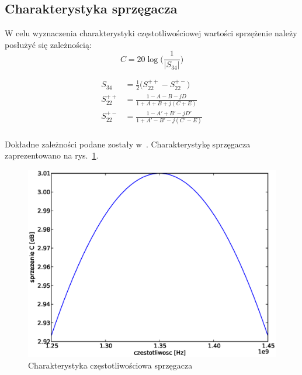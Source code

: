 \documentclass[rep.tex]{subfiles}
\begin{document}
\subsection{Charakterystyka sprzęgacza}
W celu wyznaczenia charakterystyki częstotliwościowej wartości sprzężenie należy posłużyć się zależnością:
\begin{equation}
  C = 20 \log\Big(\frac{1}{|S_{34}|}\Big)
\end{equation}

\begin{align}
  S_{34} &= \frac{1}{2} \Big(S_{22}^{++} - S_{22}^{+-}\Big) \\
  S_{22}^{++} &= \frac{1 - A - B - jD}{1 + A + B + j(C + E)} \\
  S_{22}^{+-} &= \frac{1 - A' + B' - jD'}{1 + A' - B' - j(C' - E)} \\
\end{align}

Dokładne zależności podane zostały w~\cite{obwody}.
Charakterystykę sprzęgacza zaprezentowano na rys.~\ref{fig:zad13:freq}.

\begin{figure}[!htbp]
  \centering
  \includegraphics[scale=0.5]{fig/zad13/freq}
  \caption{Charakterystyka częstotliwościowa sprzęgacza}
  \label{fig:zad13:freq}
\end{figure}
\end{document}
